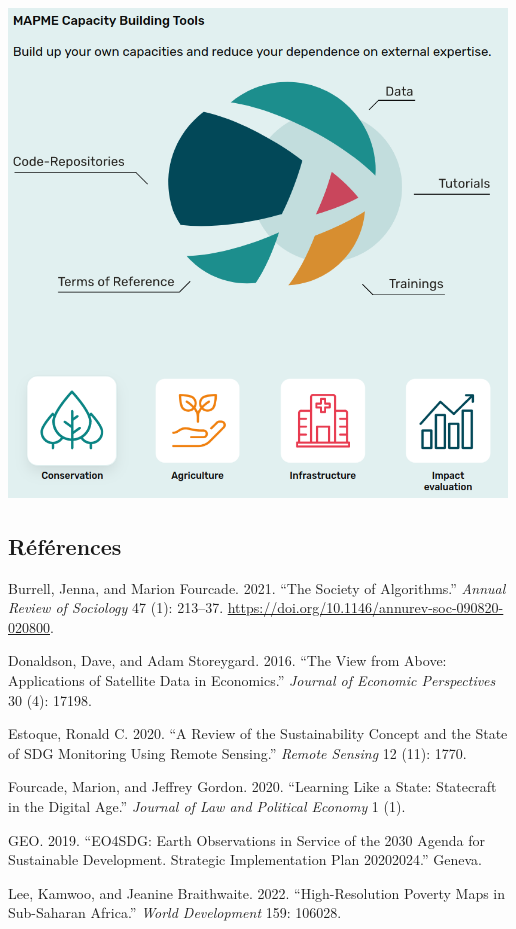 \documentclass[
  letterpaper,
  DIV=11,
  numbers=noendperiod]{scrartcl}
\newlength{\cslhangindent}
\newlength{\cslentryspacingunit} %
\newenvironment{CSLReferences}[2] %
 {%
  \setlength{\parindent}{0pt}
  \ifodd #1
  \let\oldpar\par
  \def\par{\hangindent=\cslhangindent\oldpar}
  \fi
  \setlength{\parskip}{#2\cslentryspacingunit}
 }%
 {}
\begin{document}
\includegraphics[width=5.20833in,height=\textheight]{sources/Mapme.png}

\hypertarget{ruxe9fuxe9rences}{%
\subsection*{Références}\label{ruxe9fuxe9rences}}

\hypertarget{refs}{}
\begin{CSLReferences}{1}{0}
\leavevmode{}%
Burrell, Jenna, and Marion Fourcade. 2021. {``The Society of
Algorithms.''} \emph{Annual Review of Sociology} 47 (1): 213--37.
\url{https://doi.org/10.1146/annurev-soc-090820-020800}.

\leavevmode{}%
Donaldson, Dave, and Adam Storeygard. 2016. {``The View from Above:
Applications of Satellite Data in Economics.''} \emph{Journal of
Economic Perspectives} 30 (4): 17198.

\leavevmode{}%
Estoque, Ronald C. 2020. {``A Review of the Sustainability Concept and
the State of SDG Monitoring Using Remote Sensing.''} \emph{Remote
Sensing} 12 (11): 1770.

\leavevmode{}%
Fourcade, Marion, and Jeffrey Gordon. 2020. {``Learning Like a State:
Statecraft in the Digital Age.''} \emph{Journal of Law and Political
Economy} 1 (1).

\leavevmode{}%
GEO. 2019. {``EO4SDG: Earth Observations in Service of the 2030 Agenda
for Sustainable Development. Strategic Implementation Plan
2020{\textendash}2024.''} Geneva.

\leavevmode{}%
Lee, Kamwoo, and Jeanine Braithwaite. 2022. {``High-Resolution Poverty
Maps in Sub-Saharan Africa.''} \emph{World Development} 159: 106028.

\end{CSLReferences}
\end{document}

